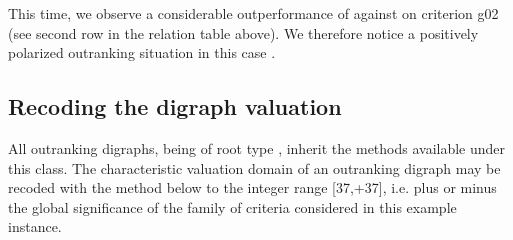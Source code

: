 \documentclass[a4paper,12pt,english]{sphinxhowto}
\begin{document}
\begin{sphinxVerbatim}[commandchars=\\\{\},numbers=left,firstnumber=1,stepnumber=1]
\end{sphinxVerbatim}

This time, we observe a considerable out\sphinxhyphen{}performance of  against  on criterion g02 (see second row in the relation table above). We therefore notice a positively polarized  outranking situation in this case .


\subsection{Recoding the digraph valuation}
\label{\detokenize{tutorial:recoding-the-digraph-valuation}}
All outranking digraphs, being of root type , inherit the methods available under this class. The characteristic valuation domain of an outranking digraph may be recoded with the  method below to the integer range {[}\sphinxhyphen{}37,+37{]}, i.e. plus or minus the global significance of the family of criteria considered in this example instance.
\end{document}
